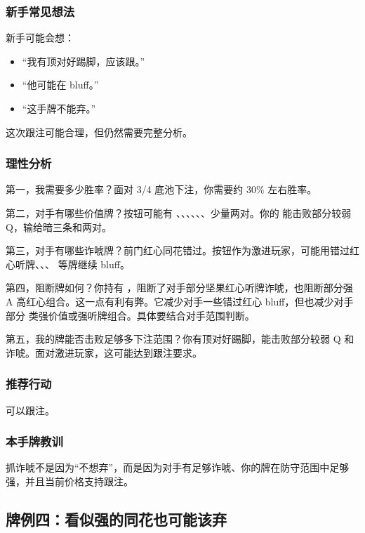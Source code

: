 \subsubsection*{新手常见想法}

新手可能会想：

\begin{itemize}
\item “我有顶对好踢脚，应该跟。”
\item “他可能在 bluff。”
\item “这手牌不能弃。”
\end{itemize}

这次跟注可能合理，但仍然需要完整分析。

\subsubsection*{理性分析}

第一，我需要多少胜率？面对 3/4 底池下注，你需要约 30\% 左右胜率。

第二，对手有哪些价值牌？按钮可能有 、、、、、、少量两对。你的  能击败部分较弱 Q，输给暗三条和两对。

第三，对手有哪些诈唬牌？前门红心同花错过。按钮作为激进玩家，可能用错过红心听牌、、、 等牌继续 bluff。

第四，阻断牌如何？你持有 ，阻断了对手部分坚果红心听牌诈唬，也阻断部分强 A 高红心组合。这一点有利有弊。它减少对手一些错过红心 bluff，但也减少对手部分  类强价值或强听牌组合。具体要结合对手范围判断。

第五，我的牌能否击败足够多下注范围？你有顶对好踢脚，能击败部分较弱 Q 和诈唬。面对激进玩家，这可能达到跟注要求。

\subsubsection*{推荐行动}

可以跟注。

\subsubsection*{本手牌教训}

抓诈唬不是因为“不想弃”，而是因为对手有足够诈唬、你的牌在防守范围中足够强，并且当前价格支持跟注。

\subsection{牌例四：看似强的同花也可能该弃}

